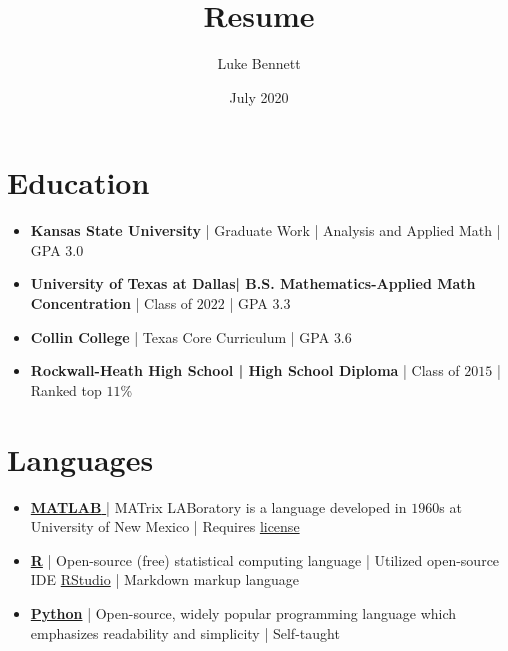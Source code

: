 \documentclass{article}
\title{Resume}
\author{Luke Bennett}
\date{July 2020}
\begin{document}
\makecvtitle

\section{Education}
\begin{itemize}
\item \textbf{Kansas State University} | Graduate Work | Analysis and Applied Math | GPA $3.0$
\item \textbf{University of Texas at Dallas| B.S. Mathematics-Applied Math Concentration} | Class of $2022$ |  GPA $3.3$
\item \textbf{Collin College} | Texas Core Curriculum | GPA $3.6$
\item \textbf{Rockwall-Heath High School | High School Diploma} | Class of $2015$ | Ranked top $11$\% \medskip
\end{itemize}

 \section{Languages }
\begin{itemize}

    \item \href{https://www.mathworks.com/products/matlab/programming-with-matlab.html}{\textbf{MATLAB} }| MATrix LABoratory is a language developed in $1960$s at University of New Mexico | Requires \href{https://www.mathworks.com/pricing-licensing.html}{license} 

    \item \href{https://www.r-project.org/about.html}{\textbf{R}} | Open-source (free) statistical computing language | Utilized open-source IDE \href{https://posit.co/download/rstudio-desktop/}{RStudio} | Markdown markup language 

    \item \href{https://www.python.org/}{\textbf{Python}} | Open-source, widely popular programming language which emphasizes readability and simplicity | Self-taught \medskip
\end{itemize}
\end{document}
